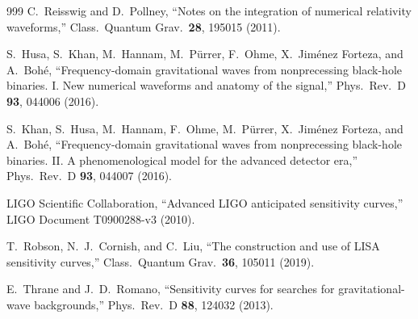 \documentclass[twocolumn,floatfix,aps,prd,superscriptaddress,nofootinbib]{revtex4-2}
\begin{document}
\begin{thebibliography}{999}
C.~Reisswig and D.~Pollney,
\newblock ``Notes on the integration of numerical relativity waveforms,''
\newblock Class.\ Quantum Grav.\ \textbf{28}, 195015 (2011).

S.~Husa, S.~Khan, M.~Hannam, M.~P\"urrer, F.~Ohme, X.~Jim\'enez Forteza, and A.~Boh\'e,
\newblock ``Frequency-domain gravitational waves from nonprecessing black-hole binaries. I. New numerical waveforms and anatomy of the signal,''
\newblock Phys.\ Rev.\ D \textbf{93}, 044006 (2016).

S.~Khan, S.~Husa, M.~Hannam, F.~Ohme, M.~P\"urrer, X.~Jim\'enez Forteza, and A.~Boh\'e,
\newblock ``Frequency-domain gravitational waves from nonprecessing black-hole binaries. II. A phenomenological model for the advanced detector era,''
\newblock Phys.\ Rev.\ D \textbf{93}, 044007 (2016).

LIGO Scientific Collaboration,
\newblock ``Advanced LIGO anticipated sensitivity curves,''
\newblock LIGO Document T0900288-v3 (2010).

T.~Robson, N.~J.~Cornish, and C.~Liu,
\newblock ``The construction and use of LISA sensitivity curves,''
\newblock Class.\ Quantum Grav.\ \textbf{36}, 105011 (2019).

E.~Thrane and J.~D.~Romano,
\newblock ``Sensitivity curves for searches for gravitational-wave backgrounds,''
\newblock Phys.\ Rev.\ D \textbf{88}, 124032 (2013).

\end{thebibliography}
\end{document}
